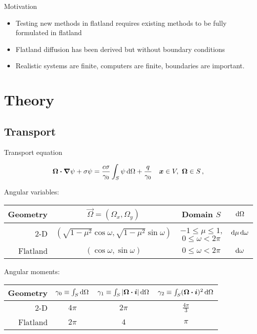 \documentclass{beamer}
\begin{document}
\begin{frame}{Motivation}
  \begin{itemize}
    \item Testing new methods in flatland requires existing methods to be fully
      formulated in flatland
    \item Flatland diffusion has been derived \cite{Asa2008} but without
      boundary conditions
    \item Realistic systems are finite, computers are finite, boundaries are
      important.
  \end{itemize}
\end{frame}

\section{Theory}
\subsection{Transport}
\begin{frame}{Transport equation}

\begin{equation}\label{eq:generalTransport}
  \bm{\Omega}\bm{\cdot} \bm{\nabla} \psi + \sigma \psi
  = \frac{c \sigma}{\gamma_0} \int_{S} \psi \mathop{}\!\mathrm{d}\Omega + \frac{q}{\gamma_0}
  \quad \bm{x}\in V,\ \bm{\Omega}\in S \,,
\end{equation}

  \vspace{2ex}

  \small
  \centering
  Angular variables:
  \begin{tabular}{rccc}
\toprule
   Geometry & $\vec{\Omega}=(\Omega_x, \Omega_y)$ & Domain $S$ & $\mathop{}\!\mathrm{d}\Omega$
\\ \midrule
2-D & $( \sqrt{1-\mu^2} \cos \omega,
   \sqrt{1-\mu^2} \sin \omega)$
   & $-1 \le \mu \le 1$, $0 \le \omega < 2\pi$ & $\mathop{}\!\mathrm{d}\mu \mathop{}\!\mathrm{d} \omega$
   \\
   Flatland & $ ( \cos \omega, \sin \omega )$
   & $0 \le \omega < 2\pi$ & $\mathop{}\!\mathrm{d} \omega$
\\ \bottomrule
  \end{tabular}

  \vspace{2ex}

Angular moments:
  \centering
  \begin{tabular}{rccc}
\toprule
   Geometry
   & $\gamma_0 \equiv \int_S \mathop{}\!\mathrm{d}\Omega$
   & $\gamma_1 \equiv \int_S \left| \bm{\Omega}\bm{\cdot}\bm{i} \right| \mathop{}\!\mathrm{d}\Omega$
   & $\gamma_2 \equiv \int_S (\bm{\Omega}\bm{\cdot}\bm{i})^2 \mathop{}\!\mathrm{d}\Omega$
\\ \midrule
   2-D & $4\pi$ & $2\pi$ & $\frac{4\pi}{3}$
   \\
   Flatland & $2\pi$ & $4$ & $\pi$
\\ \bottomrule
  \end{tabular}

\end{frame}
\end{document}
